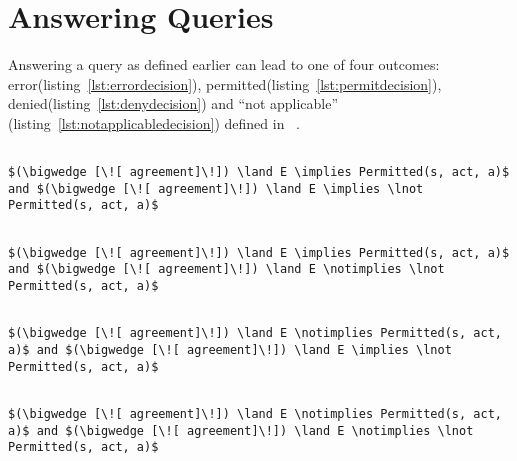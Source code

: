 \section{Answering Queries}

Answering a query as defined earlier can lead to one of four outcomes: error(listing~\ref{lst:errordecision}), permitted(listing~\ref{lst:permitdecision}), denied(listing~\ref{lst:denydecision}) and ``not applicable'' (listing~\ref{lst:notapplicabledecision}) defined in ~\cite{Tschantz}.

\lstset{mathescape, language=AST} 
\begin{lstlisting}[frame=single, caption={Answerable Queries: Error},label={lst:errordecision}]

$(\bigwedge [\![ agreement]\!]) \land E \implies Permitted(s, act, a)$ and $(\bigwedge [\![ agreement]\!]) \land E \implies \lnot Permitted(s, act, a)$

\end{lstlisting}

\lstset{mathescape, language=AST} 
\begin{lstlisting}[frame=single, caption={Answerable Queries: Permit},label={lst:permitdecision}]

$(\bigwedge [\![ agreement]\!]) \land E \implies Permitted(s, act, a)$ and $(\bigwedge [\![ agreement]\!]) \land E \notimplies \lnot Permitted(s, act, a)$

\end{lstlisting}

\lstset{mathescape, language=AST} 
\begin{lstlisting}[frame=single, caption={Answerable Queries: Deny},label={lst:denydecision}]

$(\bigwedge [\![ agreement]\!]) \land E \notimplies Permitted(s, act, a)$ and $(\bigwedge [\![ agreement]\!]) \land E \implies \lnot Permitted(s, act, a)$

\end{lstlisting}

\lstset{mathescape, language=AST} 
\begin{lstlisting}[frame=single, caption={Answerable Queries: Not Applicable},label={lst:notapplicabledecision}]

$(\bigwedge [\![ agreement]\!]) \land E \notimplies Permitted(s, act, a)$ and $(\bigwedge [\![ agreement]\!]) \land E \notimplies \lnot Permitted(s, act, a)$

\end{lstlisting}


